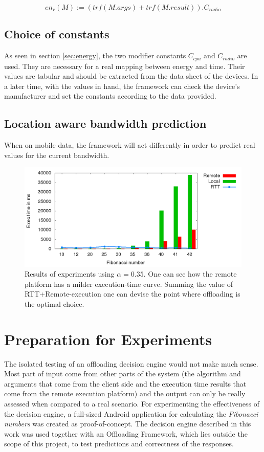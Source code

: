 \documentclass[10pt, conference, letterpaper]{IEEEtran}
\begin{document}
  \begin{equation} \label{eq:energyremote}
    en_{r}(M) := (trf(M.args) + trf(M.result)) . C_{radio}
  \end{equation}

  \subsection{Choice of constants}
  As seen in section \ref{sec:energy}, the two modifier constants $C_{cpu}$ and $C_{radio}$ are used. They are necessary for a real mapping between energy and time. Their values are tabular and should be extracted from the data sheet of the devices. In a later time, with the values in hand, the framework can check the device's manufacturer and set the constants according to the data provided.

  \subsection{Location aware bandwidth prediction}
  When on mobile data, the framework will act differently in order to predict real values for the current bandwidth. 

\begin{figure}[!t]
  \centering
  \includegraphics[width=1\textwidth]{plots/executions/executions.png}
  \caption{Results of experiments using $\alpha = 0.35$. One can see how the remote platform has a milder execution-time curve. Summing the value of RTT+Remote-execution one can devise the point where offloading is the optimal choice.}
  \label{fig:exectime}
\end{figure}

  \section{Preparation for Experiments}
  The isolated testing of an offloading decision engine would not make much sense. Most part of input come from other parts of the system (the algorithm and arguments that come from the client side and the execution time results that come from the remote execution platform) and the output can only be really assessed when compared to a real scenario. For experimenting the effectiveness of the decision engine, a full-sized Android application for calculating the \textit{Fibonacci numbers} was created as proof-of-concept. The decision engine described in this work was used together with an Offloading Framework, which lies outside the scope of this project, to test predictions and correctness of the responses.
\end{document}
